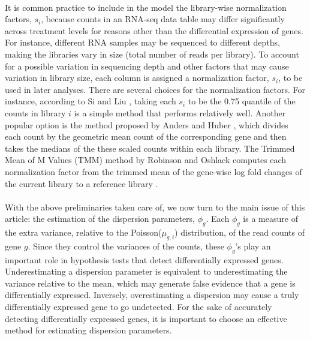 \documentclass[10pt]{article}
\begin{document}
\paragraph{} \indent It is common practice to include in the model the library-wise normalization factors, $s_i$, because counts in an RNA-seq data table may differ significantly across treatment levels for reasons other than the differential expression of genes. For instance, different RNA samples may be sequenced to different depths, making the libraries vary in size (total number of reads per library). To account for a possible variation in sequencing depth and other factors that may cause variation in library size, each column is assigned a normalization factor, $s_i$, to be used in later analyses. There are several choices for the normalization factors. For instance, according to Si and Liu \cite{amap}, taking each $s_i$ to be the 0.75 quantile of the counts in library $i$ is a simple method that performs relatively well. Another popular option is the method proposed by Anders and Huber \cite{deseq}, which divides each count by the geometric mean count of the corresponding gene and then takes the medians of the these scaled counts within each library. The Trimmed Mean of M Values (TMM) method by Robinson and Oshlack computes %
each normalization factor from the trimmed mean of the gene-wise log fold changes of the current library to a reference library \cite{tmm}.




\paragraph{} \indent With the above preliminaries taken care of, we now turn to the main issue of this article: the estimation of the dispersion parameters, $\phi_{g}$. Each $\phi_{g}$ is a measure of the extra variance, relative to the Poisson($\mu_{g,i}$) distribution, of the read counts of gene $g$. Since they control the variances of the counts, these $\phi_g$'s play an important role in hypothesis tests that detect differentially expressed genes. Underestimating a dispersion parameter is equivalent to underestimating the variance relative to the mean, which may generate false evidence that a gene is differentially expressed. Inversely, overestimating a dispersion may cause a truly differentially expressed gene %
to go undetected. For the sake of accurately detecting differentially expressed genes, it is important to choose an effective method for estimating dispersion parameters.
\end{document}

